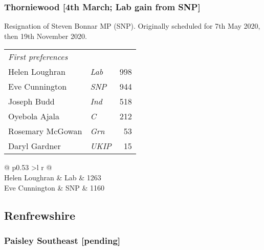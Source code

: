 \documentclass[a4paper,openany]{book}
\begin{document}
\begin{resultsiii}
\subsubsection*{Thorniewood \hspace*{\fill}\nolinebreak[1]%
	\enspace\hspace*{\fill}
	[4th March; Lab gain from SNP]}


Resignation of Steven Bonnar MP (SNP).  Originally scheduled for 7th May 2020, then 19th November 2020.

\noindent
\begin{tabular*}{\columnwidth}{@{\extracolsep{\fill}} p{} >{\itshape}l r @{\extracolsep{\fill}}}
	\emph{First preferences}\\
	Helen Loughran & Lab & 998\\
	Eve Cunnington & SNP & 944\\
	Joseph Budd & Ind & 518\\
	Oyebola Ajala & C & 212\\
	Rosemary McGowan & Grn & 53\\
	Daryl Gardner & UKIP & 15\\
\end{tabular*}

\noindent
\begin{tabular*}{\columnwidth}{@{\extracolsep{\fill}} p{} >{\itshape}l r @{\extracolsep{\fill}}}
\\
	Helen Loughran & Lab & 1263\\
	Eve Cunnington & SNP & 1160\\
\end{tabular*}

\subsection*{Renfrewshire}

\subsubsection*{Paisley Southeast \hspace*{\fill}\nolinebreak[1]%
	\enspace\hspace*{\fill}
	[pending]}


\end{resultsiii}
\end{document}
